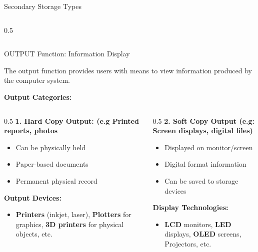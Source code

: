 \documentclass[aspectratio=169]{beamer}
\begin{document}
\begin{frame}{Secondary Storage Types}
\begin{columns}
\begin{column}{0.5\textwidth}
        
        \end{column}

    \end{columns}
 
      
\end{frame}

\begin{frame}{OUTPUT Function: Information Display}
    \begin{definition}
        The output function provides users with means to view information produced by the computer system.
    \end{definition}
    
    \textbf{Output Categories:}
    
    \begin{columns}
        \begin{column}{0.5\textwidth}
            \textbf{1. Hard Copy Output: (e.g Printed reports, photos}
            \begin{itemize}
                \item Can be physically held
                \item Paper-based documents 
                \item Permanent physical record
            \end{itemize}
            
            \textbf{Output Devices:}
            \begin{itemize}
                \item \textbf{Printers} (inkjet, laser), \textbf{Plotters} for graphics, \textbf{3D printers} for physical objects, etc.
            \end{itemize}
        \end{column}
        \begin{column}{0.5\textwidth}
            \textbf{2. Soft Copy Output (e.g: Screen displays, digital files)}
            \begin{itemize}
                \item Displayed on monitor/screen
                \item Digital format information
                \item Can be saved to storage devices 
            \end{itemize}
            
            \textbf{Display Technologies:}
            \begin{itemize}
                \item \textbf{LCD} monitors, \textbf{LED} displays, \textbf{OLED} screens, Projectors, etc.
            \end{itemize}
        \end{column}
    \end{columns}
\end{frame}
\end{document}
